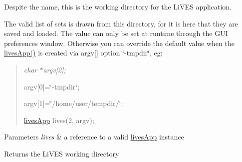 Despite the name, this is the working directory for the Li\-V\-E\-S application. 

The valid list of sets is drawn from this directory, for it is here that they are saved and loaded. The value can only be set at runtime through the G\-U\-I preferences window. Otherwise you can override the default value when the \hyperlink{namespacelives_a86fb37876fc3d921867e0b8dbeba6a00}{lives\-App()} is created via argv\mbox{[}\mbox{]} option \char`\"{}-\/tmpdir\char`\"{}, eg\-: \par
 \par
\begin{quotation}
{\itshape  char $\ast$argv\mbox{[}2\mbox{]}; \par
 argv\mbox{[}0\mbox{]}=\char`\"{}-\/tmpdir\char`\"{}; \par
 argv\mbox{[}1\mbox{]}=\char`\"{}/home/user/tempdir/\char`\"{}; \par
 \hyperlink{classlives_1_1livesApp}{lives\-App} lives(2, argv); \par
 }\end{quotation}

\begin{DoxyParams}{Parameters}
{\em lives} & a reference to a valid \hyperlink{classlives_1_1livesApp}{lives\-App} instance \\
\hline
\end{DoxyParams}
\begin{DoxyReturn}{Returns}
the Li\-V\-E\-S working directory 
\end{DoxyReturn}
